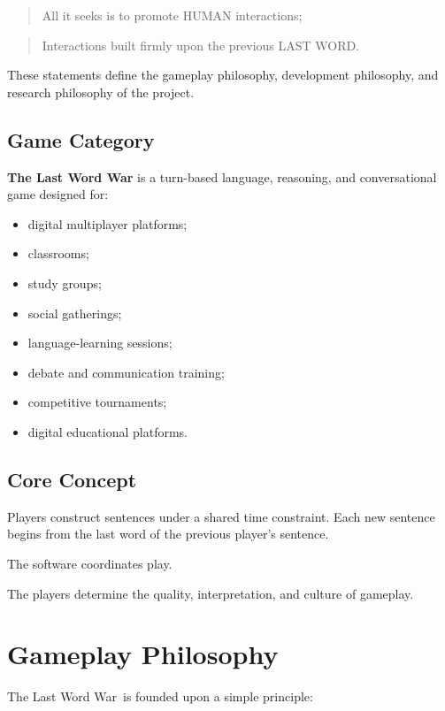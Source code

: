 \documentclass[11pt,a4paper]{article}
\begin{document}
\begin{quote}
All it seeks is to promote HUMAN interactions;
\end{quote}

\begin{quote}
Interactions built firmly upon the previous LAST WORD.
\end{quote}

These statements define the gameplay philosophy, development philosophy, and research philosophy of the project.

\subsection{Game Category}

\textbf{The Last Word War\texttrademark} is a turn-based language, reasoning, and conversational game designed for:

\begin{itemize}
    \item digital multiplayer platforms;
    \item classrooms;
    \item study groups;
    \item social gatherings;
    \item language-learning sessions;
    \item debate and communication training;
    \item competitive tournaments;
    \item digital educational platforms.
\end{itemize}

\subsection{Core Concept}

Players construct sentences under a shared time constraint. Each new sentence begins from the last word of the previous player's sentence.

The software coordinates play.

The players determine the quality, interpretation, and culture of gameplay.

\section{Gameplay Philosophy}

The Last Word War\texttrademark\ is founded upon a simple principle:
\end{document}
